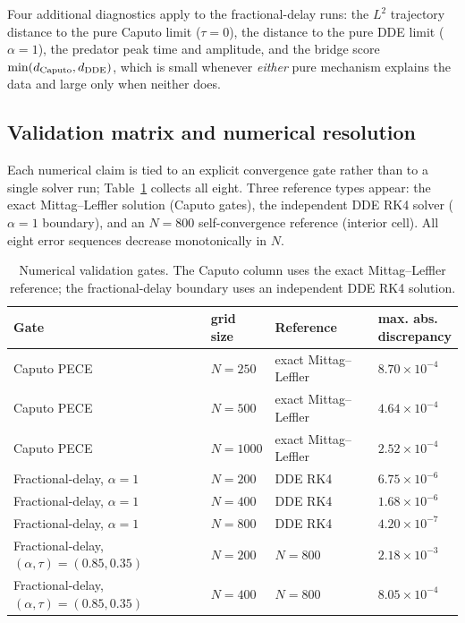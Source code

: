 Four additional diagnostics apply to the fractional-delay runs: the $L^2$ trajectory distance to the pure Caputo limit ($\tau=0$), the distance to the pure DDE limit ($\alpha=1$), the predator peak time and amplitude, and the bridge score $\min(d_{\rm Caputo},d_{\rm DDE})$, which is small whenever \emph{either} pure mechanism explains the data and large only when neither does.

\subsection{Validation matrix and numerical resolution}
Each numerical claim is tied to an explicit convergence gate rather than to a single solver run; Table~\ref{tab:solver-validation} collects all eight. Three reference types appear: the exact Mittag--Leffler solution (Caputo gates), the independent DDE RK4 solver ($\alpha=1$ boundary), and an $N=800$ self-convergence reference (interior cell). All eight error sequences decrease monotonically in $N$.

\begin{table}[htbp]
\centering
\caption{Numerical validation gates. The Caputo column uses the exact Mittag--Leffler reference; the fractional-delay boundary uses an independent DDE RK4 solution.}
\label{tab:solver-validation}
\footnotesize
\begin{tabular}{p{}p{}p{}p{}}
\hline
\textbf{Gate} & \shortstack{\textbf{grid}\\\textbf{size}} & \textbf{Reference} & \shortstack{\textbf{max. abs.}\\\textbf{discrepancy}}\\
\hline
Caputo PECE & $N=250$ & exact Mittag--Leffler & $8.70\times10^{-4}$\\
Caputo PECE & $N=500$ & exact Mittag--Leffler & $4.64\times10^{-4}$\\
Caputo PECE & $N=1000$ & exact Mittag--Leffler & $2.52\times10^{-4}$\\
Fractional-delay, $\alpha=1$ & $N=200$ & DDE RK4 & $6.75\times10^{-6}$\\
Fractional-delay, $\alpha=1$ & $N=400$ & DDE RK4 & $1.68\times10^{-6}$\\
Fractional-delay, $\alpha=1$ & $N=800$ & DDE RK4 & $4.20\times10^{-7}$\\
Fractional-delay, $(\alpha,\tau)=(0.85,0.35)$ & $N=200$ & $N=800$ & $2.18\times10^{-3}$\\
Fractional-delay, $(\alpha,\tau)=(0.85,0.35)$ & $N=400$ & $N=800$ & $8.05\times10^{-4}$\\
\hline
\end{tabular}
\end{table}

